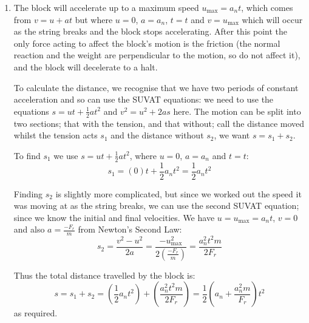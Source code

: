 \begin{problem}[A1987PSIIQ9a]
{\begin{enumerate}
	\item The block will accelerate up to a maximum speed $u_{\text{max}} = a_{n}t$, which comes from $v= u + at$ but where $u = 0$, $a = a_{n}$, $t=t$ and $ v = u_{\text{max}}$ which will occur as the string breaks and the block stops accelerating. After this point the only force acting to affect the block's motion is the friction (the normal reaction and the weight are perpendicular to the motion, so do not affect it), and the block will decelerate to a halt.

To calculate the distance, we recognise that we have two periods of constant acceleration and so can use the SUVAT equations: we need to use the equations $s = ut + \frac{1}{2}at^{2}$ and $v^{2} = u^{2} + 2as$ here. The motion can be split into two sections; that with the tension, and that without; call the distance moved whilst the tension acts $s_{1}$ and the distance without $s_{2}$, we want $s = s_{1} + s_{2}$.

To find $s_{1}$ we use $s = ut + \frac{1}{2}at^{2}$, where $u = 0$, $a = a_{n}$ and $t = t$:
\begin{equation*} 
s_{1} = (0)t + \frac{1}{2} a_{n}t^{2} = \frac{1}{2} a_{n}t^{2} 
\end{equation*}

Finding $s_{2}$ is slightly more complicated, but since we worked out the speed it was moving at as the string breaks, we can use the second SUVAT equation; since we know the initial and final velocities. We have $u = u_{\text{max}} = a_{n}t$, $v = 0$ and also $a = \frac{-F_{r}}{m}$ from Newton's Second Law:
\begin{equation*}
 s_{2} = \frac{v^{2} - u^{2}}{2a} = \frac{- u_{\text{max}}^{2}}{2\left( \frac{-F_{r}}{m} \right)} = \frac{a_{n}^{2} t^{2} m}{2 F_{r}} 
 \end{equation*}

Thus the total distance travelled by the block is:
\begin{equation*} 
s = s_{1} + s_{2} = \left( \frac{1}{2}a_{n}t^2 \right) + \left( \frac{a_{n}^{2}t^{2}m}{2F_{r}} \right) = \frac{1}{2} \left(a_{n} + \frac{a_{n}^{2}m}{F_{r}} \right)t^{2}
\end{equation*}
as required.


\end{enumerate}}
\end{problem}
